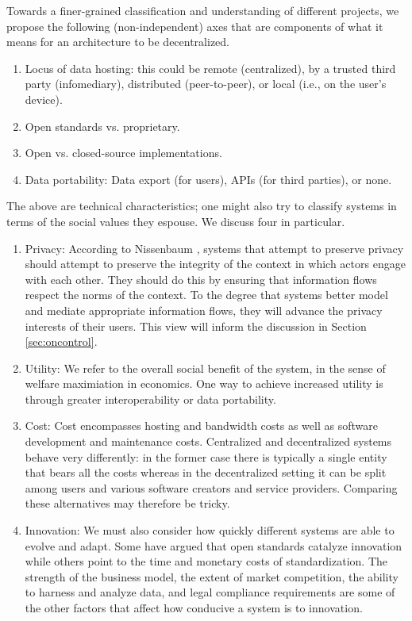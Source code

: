 \documentclass{acm_proc_article-sp}
\begin{document}
Towards a finer-grained classification and understanding of different projects, we propose the following (non-independent) axes that are components of what it means for an architecture to be decentralized. 

\vspace{-5mm}
\begin{enumerate}
	\item  Locus of data hosting: this could be remote (centralized), by a trusted third party (infomediary), distributed (peer-to-peer), or local (i.e., on the user's device). 
  \item Open standards vs. proprietary.
  \item  Open vs. closed-source implementations.
  \item  Data portability: Data export (for users), APIs (for third parties), or none.
\end{enumerate}
\vspace{-2mm}


The above are technical characteristics; one might also try to classify systems in terms of the social values they espouse. We discuss four in particular.

\vspace{-5mm}
\begin{enumerate}
    \item Privacy: According to Nissenbaum \cite{contextualintegritypaper, contextualintegritybook}, systems that attempt to preserve privacy should attempt to preserve the integrity of the context in which actors engage with each other. They should do this by ensuring that information flows respect the norms of the context. To the degree that systems better model and mediate appropriate information flows, they will advance the privacy interests of their users. This view will inform the discussion in Section \ref{sec:oncontrol}.
    \item Utility: We refer to the overall social benefit of the system, in the sense of welfare maximiation in economics. One way to achieve increased utility is through greater interoperability or data portability.
    \item Cost: Cost encompasses hosting and bandwidth costs as well as software development and maintenance costs. Centralized and decentralized systems behave very differently: in the former case there is typically a single entity that bears all the costs whereas in the decentralized setting it can be split among users and various software creators and service providers. Comparing these alternatives may therefore be tricky.
    \item Innovation: We must also consider how quickly different systems are able to evolve and adapt. Some have argued that open standards catalyze innovation while others point to the time and monetary costs of standardization. The strength of the business model, the extent of market competition, the ability to harness and analyze data, and legal compliance requirements are some of the other factors that affect how conducive a system is to innovation.
\end{enumerate}
\vspace{-2mm}
\end{document}
